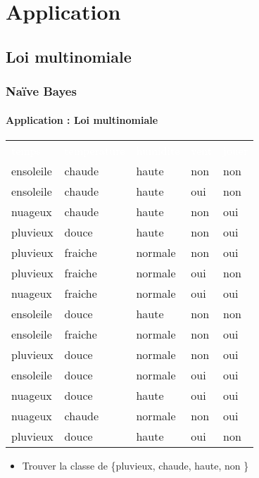 \documentclass[xcolor=table]{beamer}
\begin{document}
\section{Application}

\subsection{Loi multinomiale}

\begin{frame}
	\frametitle{Naïve Bayes}
	\framesubtitle{Application : Loi multinomiale}
	
	\scriptsize
	\begin{center}
		\begin{tabular}{lllll}
		\rowcolor{darkblue}
		\textcolor{white}{temps} & \textcolor{white}{temperature} & \textcolor{white}{humidite} & \textcolor{white}{vent} & \textcolor{white}{jouer} \\
		ensoleile & chaude & haute & non & non \\
		ensoleile & chaude & haute & oui & non \\
		nuageux & chaude & haute & non & oui \\
		pluvieux & douce & haute & non & oui \\
		pluvieux & fraiche & normale & non & oui \\
		pluvieux & fraiche & normale & oui & non \\
		nuageux & fraiche & normale & oui & oui \\
		ensoleile & douce & haute & non & non \\
		ensoleile & fraiche & normale & non & oui \\
		pluvieux & douce & normale & non & oui \\
		ensoleile & douce & normale & oui & oui \\
		nuageux & douce & haute & oui & oui \\
		nuageux & chaude & normale & non & oui \\
		pluvieux & douce & haute & oui & non \\
	\end{tabular}
	\end{center}

	\begin{itemize}
		\item Trouver la classe de \{pluvieux, chaude, haute, non \}
	\end{itemize}
	
	
\end{frame}
\end{document}

